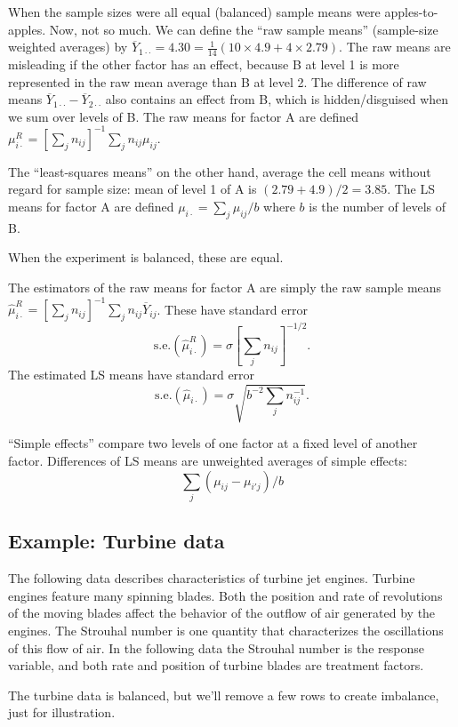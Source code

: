 \documentclass[
]{book}
\begin{document}
When the sample sizes were all equal (balanced) sample means were apples-to-apples. Now, not so much. We can define the ``raw sample means'' (sample-size weighted averages) by \(\overline Y_{1\cdot\cdot} = 4.30= \frac{1}{14}(10\times 4.9 + 4\times 2.79)\). The raw means are misleading if the other factor has an effect, because B at level 1 is more represented in the raw mean average than B at level 2. The difference of raw means \(\overline Y_{1\cdot\cdot} - \overline Y_{2\cdot\cdot}\) also contains an effect from B, which is hidden/disguised when we sum over levels of B. The raw means for factor A are defined \(\mu_{i\cdot}^R = [\sum_{j}n_{ij}]^{-1}\sum_j n_{ij}\mu_{ij}\).

The ``least-squares means'' on the other hand, average the cell means without regard for sample size: mean of level 1 of A is \((2.79+4.9)/2 = 3.85\). The LS means for factor A are defined \(\mu_{i\cdot} = \sum_{j} \mu_{ij}/b\) where \(b\) is the number of levels of B.

When the experiment is balanced, these are equal.

The estimators of the raw means for factor A are simply the raw sample means \(\hat\mu_{i\cdot}^{R} = [\sum_{j}n_{ij}]^{-1}\sum_j n_{ij}\overline Y_{ij}\). These have standard error
\[\text{s.e.}(\hat\mu_{i\cdot}^{R})=\sigma\left[\sum_{j}n_{ij}\right]^{-1/2}.\]
The estimated LS means have standard error
\[\text{s.e.}(\hat\mu_{i\cdot})=\sigma\sqrt{b^{-2}\sum_j n_{ij}^{-1}}.\]

``Simple effects'' compare two levels of one factor at a fixed level of another factor. Differences of LS means are unweighted averages of simple effects:
\[\sum_j(\mu_{ij} - \mu_{i'j})/b\]

\hypertarget{example-turbine-data}{%
\subsection{Example: Turbine data}\label{example-turbine-data}}

The following data describes characteristics of turbine jet engines. Turbine engines feature many spinning blades. Both the position and rate of revolutions of the moving blades affect the behavior of the outflow of air generated by the engines. The Strouhal number is one quantity that characterizes the oscillations of this flow of air. In the following data the Strouhal number is the response variable, and both rate and position of turbine blades are treatment factors.

The turbine data is balanced, but we'll remove a few rows to create imbalance, just for illustration.
\end{document}

